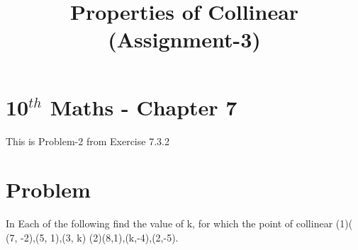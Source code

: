 \documentclass[10pt, a4paper]{article}
\begin{document}
\title{Properties of Collinear (Assignment-3)}
\date{}
\maketitle

\begin{center}
\title{\textbf{}}
\date{\vspace{-5ex}} %
\maketitle
\end{center}

\setcounter{page}{1}

\section{10$^{th}$ Maths - Chapter 7}

This is Problem-2 from Exercise 7.3.2

\section{Problem } 
In Each of the following find the value of k, for which the point of collinear (1)( (7, -2),(5, 1),(3, k) (2)(8,1),(k,-4),(2,-5).\\
\end{document}
